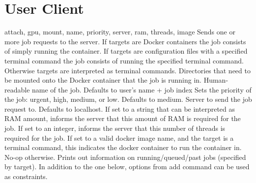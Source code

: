 \section{User Client}
{attach, gpu, mount, name, priority, server, ram, threads, image}
{Sends one or more job requests to the server.
If targets are Docker containers the job consists of simply running the container.
If targets are configuration files with a specified terminal command the job consists of running the specified terminal command.
Otherwise targets are interpreted as terminal commands.
}
\jaoptionheader
{}
{Directories that need to be mounted onto the Docker container that the job is running in.}
{Human-readable name of the job.
Defaults to user's name + job index}
{Sets the priority of the job: urgent, high, medium, or low.
Defaults to medium.}
{Server to send the job request to.
Defaults to localhost.}
{If set to a string that can be interpreted as RAM amount, informs the server that this amount of RAM is required for the job.}
{If set to an integer, informs the server that this number of threads is required for the job.}
{If set to a valid docker image name, and the target is a terminal command, this indicates the docker container to run the container in.
No-op otherwise.}
{Prints out information on running/queued/past jobs (specified by target).
In addition to the one below, options from add command can be used as constraints.}
\jaoptionheader
{}
